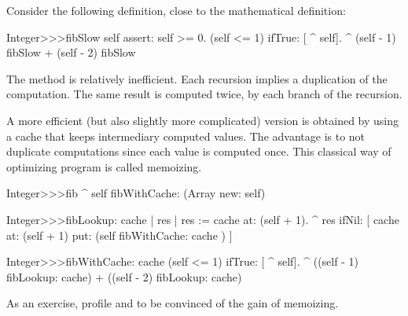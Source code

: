 \documentclass[a4paper,10pt,twoside]{book}
\begin{document}
Consider the following definition, close to the mathematical definition:
\begin{code}{}
Integer>>>fibSlow
	self assert: self >= 0.
	(self <= 1) ifTrue: [ ^ self].
	^ (self - 1) fibSlow + (self - 2) fibSlow
\end{code}

The method  is relatively inefficient. Each recursion implies a duplication of the computation. The same result is computed twice, by each branch of the recursion.

A more efficient (but also slightly more complicated) version is obtained by using a cache that keeps intermediary computed values. The advantage is to not duplicate computations since each value is computed once. This classical way of optimizing program is called memoizing. 
      
\begin{code}{}
Integer>>>fib
	^ self fibWithCache: (Array new: self)

Integer>>>fibLookup: cache
	| res |
	res := cache at: (self + 1).
	^ res ifNil: [ cache at: (self + 1) put:  (self fibWithCache: cache  ) ]

Integer>>>fibWithCache:  cache
	(self <= 1) ifTrue: [ ^ self].
	^ ((self - 1) fibLookup: cache) + ((self - 2) fibLookup: cache)  
\end{code}

As an exercise, profile  and  to be convinced of the gain of memoizing. 


\end{document}
